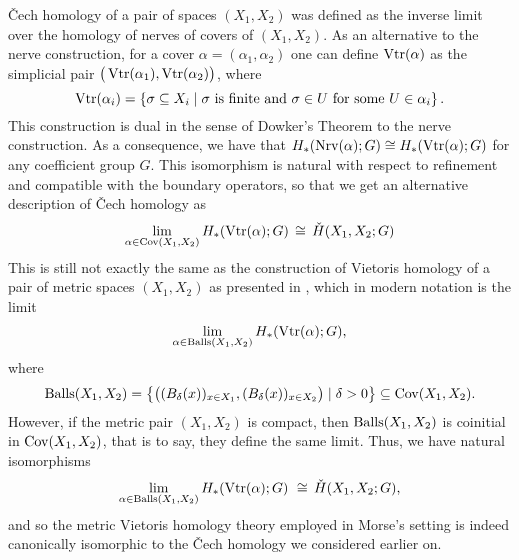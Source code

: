 \v{C}ech homology of a pair of spaces $(X_{1}, X_{2})$ was defined as the inverse limit over the homology of nerves of covers of $(X_{1}, X_{2})$.
As an alternative to the nerve construction, for a cover $\alpha = (\alpha_{1}, \alpha_{2})$ one can define $\operatorname{Vtr}(\alpha)$ as the simplicial pair $\big(\operatorname{Vtr} (\alpha_{1}), \operatorname{Vtr} (\alpha_{2})\big)$, where 
\[
\operatorname{Vtr} (\alpha_{i}) = \left\{ \sigma \subseteq X_{i} \mid \sigma \text{ is finite and } \sigma \in U \text{ for some } U \in \alpha_{i}  \right\}.
\]
This construction is dual in the sense of Dowker's Theorem \cite{Dowker.1952} to the nerve construction.
As a consequence, we have that
$
H_{*} (\operatorname{Nrv} (\alpha); G) \cong H_{*} (\operatorname{Vtr} (\alpha); G)
$
for any coefficient group $G$.
This isomorphism is natural with respect to refinement and compatible with the boundary operators, so that we get an alternative description of \v{C}ech homology as 
\[
\lim_{\alpha \in \operatorname{Cov} (X_{1}, X_{2})} H_{*} (\operatorname{Vtr} (\alpha); G) \, \cong\, \check{H} (X_{1}, X_{2}; G)
\]
This is still not exactly the same as the construction of Vietoris homology of a pair of metric spaces $(X_{1}, X_{2})$ as presented in \cite{MR1512371}, which in modern notation is the limit
\begin{equation*}
    \lim_{\alpha \in \operatorname{Balls}(X_{1}, X_{2})} H_{*} (\operatorname{Vtr} (\alpha); G),
\end{equation*}
where 
\[
\operatorname{Balls} (X_{1}, X_{2}) = \left\{ \big( ( B_{\delta} (x) )_{x \in X_{1}} , ( B_{\delta} (x) )_{x \in X_{2}} \big) \mid \delta > 0 \right\}
\subseteq \operatorname{Cov} (X_{1}, X_{2}).
\]
However, if the metric pair $(X_{1}, X_{2})$ is compact, then $\operatorname{Balls} (X_{1}, X_{2})$ is coinitial in $\operatorname{Cov} (X_{1}, X_{2})$, that is to say, they define the same limit.
Thus, we have natural isomorphisms
\[
\lim_{\alpha \in \operatorname{Balls}(X_{1}, X_{2})} H_{*} (\operatorname{Vtr} (\alpha); G) \ \cong \,
\check{H} (X_{1}, X_{2}; G),
\]
and so the metric Vietoris homology theory employed in Morse's setting is indeed canonically isomorphic to the \v{C}ech homology we considered earlier on.